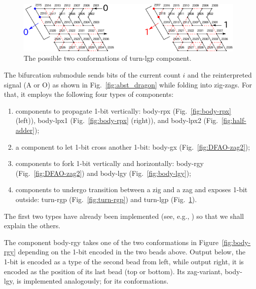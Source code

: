 \begin{figure}[h]
\centering
\includegraphics[width=0.8\linewidth]{pic/turn-lgp.pdf}
\caption{The possible two conformations of turn-lgp component.}
\label{fig:turn-lgp}
\end{figure}



The bifurcation submodule sends bits of the current count $i$ and the reinterpreted signal (A or O) as shown in Fig.~\ref{fig:abst_dragon} while folding into zig-zags.
For that, it employs the following four types of components: 
\begin{enumerate}[itemsep=0pt]
\item components to propagate 1-bit vertically: body-rpx (Fig.~\ref{fig:body-rpx} (left)), body-lpx1 (Fig.~\ref{fig:body-rpx} (right)), and body-lpx2 (Fig.~\ref{fig:half-adder});
\item a component to let 1-bit cross another 1-bit: body-gx (Fig.~\ref{fig:DFAO-zag2}); 
\item components to fork 1-bit vertically and horizontally: body-rgy (Fig.~\ref{fig:DFAO-zag2}) and body-lgy (Fig.~\ref{fig:body-lgy});  
\item components to undergo transition between a zig and a zag and exposes 1-bit outside: turn-rgp (Fig.~\ref{fig:turn-rgp}) and turn-lgp (Fig.~\ref{fig:turn-lgp}). 
\end{enumerate} 
The first two types have already been implemented (see, e.g., \cite{HaKiOtSe2016}) so that we shall explain the others.

The component body-rgy takes one of the two conformations in Figure~\ref{fig:body-rgy} depending on the 1-bit encoded in the two beads above.
Output below, the 1-bit is encoded as a type of the second bead from left, while output right, it is encoded as the position of its last bead (top or bottom).
Its zag-variant, body-lgy, is implemented analogously; for its conformations.

